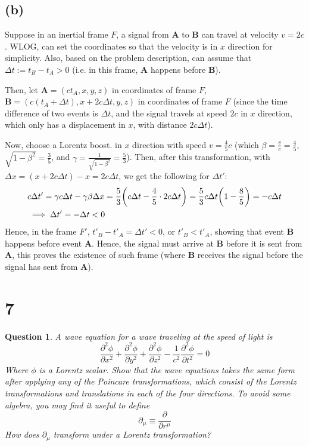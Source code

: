 \documentclass{article}
\newtheorem{question}{Question}
\DeclarePairedDelimiter{\paran}{(}{)}%
\newcommand{\bA}{\textbf{A}}
\newcommand{\bB}{\textbf{B}}
\begin{document}
\subsection*{(b)}
Suppose in an inertial frame $F$, a signal from $\bA$ to $\bB$ can travel at velocity $v=2c$. WLOG, can set the coordinates so that the velocity is in $x$ direction for simplicity. Also, based on the problem description, can assume that $\Delta t:= t_B-t_A >0$ (i.e. in this frame, $\bA$ happens before $\bB$). 

Then, let $\bA = (ct_A, x,y,z)$ in coordinates of frame $F$, $\bB = (c(t_A+\Delta t), x+2c\Delta t, y, z)$ in coordinates of frame $F$ (since the time difference of two events is $\Delta t$, and the signal travels at speed $2c$ in $x$ direction, which only has a displacement in $x$, with distance $2c\Delta t$).

\hfil

Now, choose a Lorentz boost. in $x$ direction with speed $v = \frac{4}{5}c$ (which $\beta = \frac{v}{c}=\frac{4}{5}$, $\sqrt{1-\beta^2} = \frac{3}{5}$, and $\gamma = \frac{1}{\sqrt{1-\beta^2}}=\frac{5}{3}$). Then, after this transformation, with $\Delta x = (x+2c\Delta t)-x = 2c\Delta t$, we get the following for $\Delta t'$:
\begin{align}
    &c\Delta t' = \gamma c\Delta t - \gamma\beta \Delta x  = \frac{5}{3}\paran*{c\Delta t - \frac{4}{5}\cdot 2c\Delta t} = \frac{5}{3}c\Delta t\paran*{1-\frac{8}{5}} = -c\Delta t\\
    &\implies \Delta t' = -\Delta t<0
\end{align}
Hence, in the frame $F'$, $t'_B-t'_A = \Delta t' <0$, or $t'_B < t'_A$, showing that event $\bB$ happens before event $\bA$. Hence, the signal must arrive at $\bB$ before it is sent from $\bA$, this proves the existence of such frame (where $\bB$ receives the signal before the signal has sent from $\bA$).

\break

\section*{7}
\begin{question}\label{q7}
    A wave equation for a wave traveling at the speed of light is 
    $$\frac{\partial^2\phi}{\partial x^2}+\frac{\partial^2\phi}{\partial y^2}+\frac{\partial^2\phi}{\partial z^2}-\frac{1}{c^2}\frac{\partial^2\phi}{\partial t^2}=0$$
    Where $\phi$ is a Lorentz scalar. Show that the wave equations takes the same form after applying any of the \emph{Poincare transformations}, which consist of the Lorentz transformations and translations in each of the four directions. To avoid some algebra, you may find it useful to define 
    $$\partial_\mu \equiv \frac{\partial}{\partial r^\mu}$$
    How does $\partial_\mu$ transform under a Lorentz transformation?
\end{question}
\end{document}
